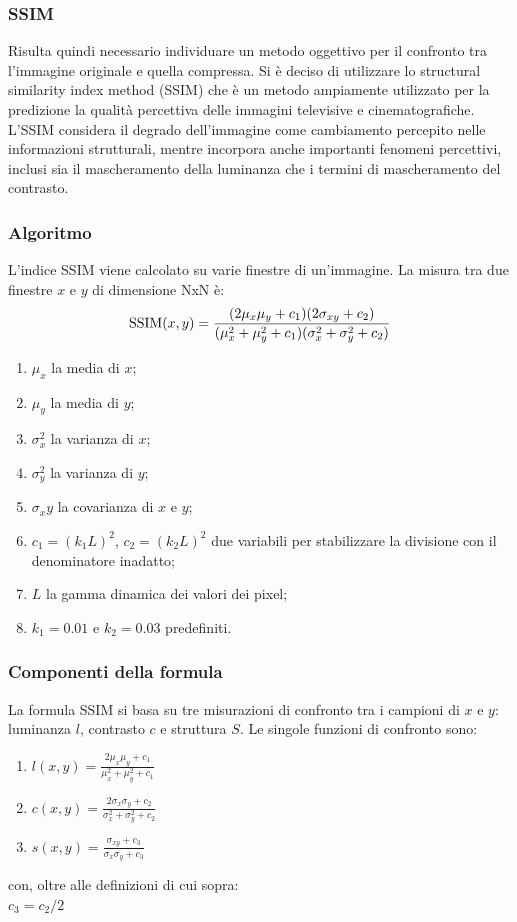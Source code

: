 \documentclass[a4paper,11pt]{article}
\begin{document}
    \subsubsection{SSIM}
    Risulta quindi necessario individuare un metodo oggettivo per il confronto tra l'immagine originale e quella compressa. 
    Si è deciso di utilizzare lo structural similarity index method (SSIM) che è un metodo ampiamente utilizzato per la predizione la qualità percettiva delle immagini televisive e cinematografiche.
    L'SSIM considera il degrado dell'immagine come cambiamento percepito nelle informazioni strutturali, mentre incorpora anche importanti fenomeni percettivi, inclusi sia il mascheramento della luminanza che i termini di mascheramento del contrasto. 
    \subsubsection{Algoritmo}
    L'indice SSIM viene calcolato su varie finestre di un'immagine. La misura tra due finestre $x$ e $y$ di dimensione NxN è: \\[0.2in]
        $$\hbox{SSIM}(x,y) = \frac{(2\mu_x\mu_y + c_1)(2\sigma_{xy} + c_2)}{(\mu_x^2 + \mu_y^2 + c_1)(\sigma_x^2 + \sigma_y^2 + c_2)}$$
    \begin{enumerate} 
        \item $\mu_x$ la media di $x$;
        \item $\mu_y$ la media di $y$;
        \item $\sigma_x^2$ la varianza di $x$;
        \item $\sigma_y^2$ la varianza di $y$;
        \item $\sigma_xy$ la covarianza di $x$ e $y$;
        \item $c_1=(k_1L)^2$, $c_2=(k_2L)^2$ due variabili per stabilizzare la divisione con il denominatore inadatto;
        \item $L$ la gamma dinamica dei valori dei pixel;
        \item $k_1=0.01$ e $k_2=0.03$ predefiniti.
   \end{enumerate}

   \newpage

    \subsubsection{Componenti della formula}
    La formula SSIM si basa su tre misurazioni di confronto tra i campioni di $x$ e $y$: luminanza $l$, contrasto $c$ e struttura $S$. Le singole funzioni di confronto sono:
    \begin{enumerate} 
        \item $l(x,y)=\frac{2\mu_x\mu_y + c_1}{\mu^2_x + \mu^2_y + c_1}$
        \item $c(x,y)=\frac{2\sigma_x\sigma_y + c_2}{\sigma^2_x + \sigma^2_y + c_2}$
        \item $s(x,y)=\frac{\sigma_{xy} + c_3}{\sigma_x \sigma_y + c_3}$
    \end{enumerate}
    con, oltre alle definizioni di cui sopra:\\
    $c_3 = c_2 / 2$ 
\end{document}
